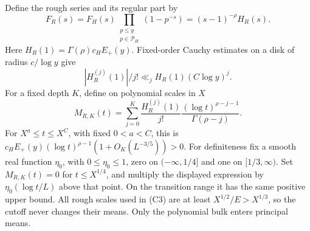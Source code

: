 Define the rough series and its regular part by
\[
 F_R(s)=F_H(s)\prod_{\substack{p\le y\\p\in\mathcal P_H}}(1-p^{-s})
        =(s-1)^{-\rho}H_R(s).
\]
Here \(H_R(1)=\Gamma(\rho)c_HE_+(y)\). Fixed-order Cauchy estimates
on a disk of radius \(c/\log y\) give
\begin{equation}\label{eq:rough-derivatives}
 |H_R^{(j)}(1)|/j!\ll_j H_R(1)(C\log y)^j.
\end{equation}
For a fixed depth \(K\), define on polynomial scales in \(X\)
\begin{equation}\label{eq:hankel-model}
 M_{R,K}(t)=\sum_{j=0}^K\frac{H_R^{(j)}(1)}{j!}
                 \frac{(\log t)^{\rho-j-1}}{\Gamma(\rho-j)}.
\end{equation}
For \(X^a\le t\le X^C\), with fixed \(0<a<C\), this is
\(c_HE_+(y)(\log t)^{\rho-1}(1+O_K(L^{-3/5}))>0\).
For definiteness fix a smooth real function \(\eta_0\), with
\(0\le\eta_0\le1\), zero on \(({-}\infty,1/4]\) and one on
\([1/3,\infty)\). Set \(M_{R,K}(t)=0\) for \(t\le X^{1/4}\),
and multiply the displayed expression by \(\eta_0(\log t/L)\)
above that point. On the transition range it has the same positive
upper bound. All rough scales used in (C3) are at least
\(X^{1/2}/E>X^{1/3}\), so the cutoff never changes their means.
Only the polynomial bulk enters principal means.

